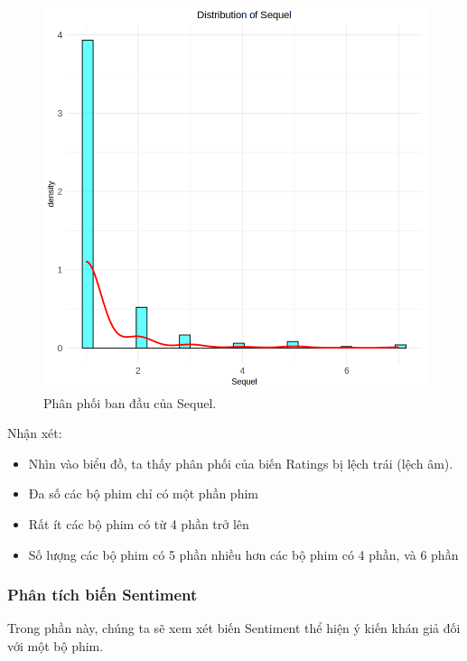 \begin{figure}[H]
    \centering
    \includegraphics[width=0.75\columnwidth]{csm_figures/sequel_original_distribution.png}
    \caption{Phân phối ban đầu của Sequel.}
    \label{fig:sequel_original_distribution}
\end{figure}

Nhận xét:
\begin{itemize}
    \item Nhìn vào biểu đồ, ta thấy phân phối của biến Ratings bị lệch trái (lệch âm).
    \item Đa số các bộ phim chỉ có một phần phim
    \item Rất ít các bộ phim có từ 4 phần trở lên
    \item Số lượng các bộ phim có 5 phần nhiều hơn các bộ phim có 4 phần, và 6 phần
\end{itemize}

\subsubsection{Phân tích biến Sentiment}

Trong phần này, chúng ta sẽ xem xét biến Sentiment thể hiện ý kiến khán giả đối với một bộ phim.

